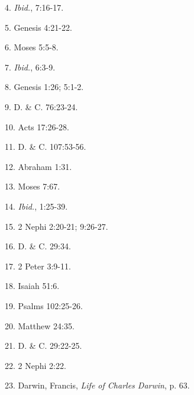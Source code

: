4. \textit{Ibid.}, 7:16-17.

5. Genesis 4:21-22.

6. Moses 5:5-8.

7. \textit{Ibid.}, 6:3-9.

8. Genesis 1:26; 5:1-2.

9. D. \& C. 76:23-24.

10. Acts 17:26-28.

11. D. \& C. 107:53-56.

12. Abraham 1:31.

13. Moses 7:67.

14. \textit{Ibid.}, 1:25-39.

15. 2 Nephi 2:20-21; 9:26-27.

16. D. \& C. 29:34.

17. 2 Peter 3:9-11.

18. Isaiah 51:6.

19. Psalms 102:25-26.

20. Matthew 24:35.

21. D. \& C. 29:22-25.

22. 2 Nephi 2:22.

23. Darwin, Francis, \textit{Life of Charles Darwin}, p. 63.

